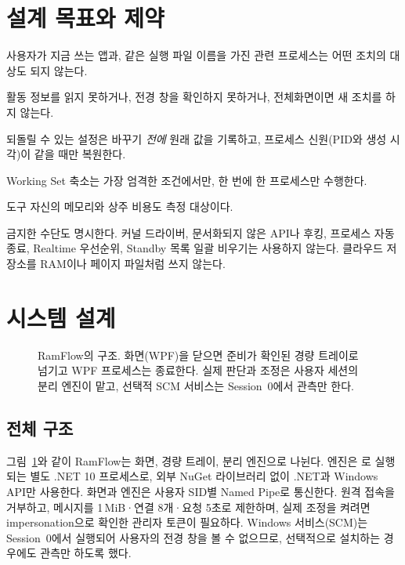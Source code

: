 \documentclass[11pt]{article}
\begin{document}
\section{설계 목표와 제약}
\label{sec:goals}

\begin{description}[leftmargin=2.2em,style=nextline,itemsep=2pt]
  \item[G1. 전경 우선] 사용자가 지금 쓰는 앱과, 같은 실행 파일 이름을 가진 관련 프로세스는 어떤 조치의 대상도 되지 않는다.
  \item[G2. 불확실하면 행동하지 않음] 활동 정보를 읽지 못하거나, 전경 창을 확인하지 못하거나, 전체화면이면 새 조치를 하지 않는다.
  \item[G3. 가역성] 되돌릴 수 있는 설정은 바꾸기 \emph{전에} 원래 값을 기록하고, 프로세스 신원(PID와 생성 시각)이 같을 때만 복원한다.
  \item[G4. 되돌릴 수 없는 조치의 최소화] Working Set 축소는 가장 엄격한 조건에서만, 한 번에 한 프로세스만 수행한다.
  \item[G5. 자기 비용 포함] 도구 자신의 메모리와 상주 비용도 측정 대상이다.
\end{description}

\noindent 금지한 수단도 명시한다. 커널 드라이버, 문서화되지 않은 API나 후킹, 프로세스 자동 종료, Realtime 우선순위, Standby 목록 일괄 비우기는 사용하지 않는다. 클라우드 저장소를 RAM이나 페이지 파일처럼 쓰지 않는다.

\section{시스템 설계}
\label{sec:design}

\begin{figure}[t]
  \centering
  
  \caption{RamFlow의 구조. 화면(WPF)을 닫으면 준비가 확인된 경량 트레이로 넘기고 WPF 프로세스는 종료한다. 실제 판단과 조정은 사용자 세션의 분리 엔진이 맡고, 선택적 SCM 서비스는 Session~0에서 관측만 한다.}
  \label{fig:arch}
\end{figure}

\subsection{전체 구조}
그림~\ref{fig:arch}와 같이 RamFlow는 화면, 경량 트레이, 분리 엔진으로 나뉜다. 엔진은 로 실행되는 별도 .NET 10 프로세스로, 외부 NuGet 라이브러리 없이 .NET과 Windows API만 사용한다. 화면과 엔진은 사용자 SID별 Named Pipe로 통신한다. 원격 접속을 거부하고, 메시지를 1\,MiB·연결 8개·요청 5초로 제한하며, 실제 조정을 켜려면 impersonation으로 확인한 관리자 토큰이 필요하다\citep{mspipe}. Windows 서비스(SCM)는 Session~0에서 실행되어 사용자의 전경 창을 볼 수 없으므로, 선택적으로 설치하는 경우에도 관측만 하도록 했다.
\end{document}
